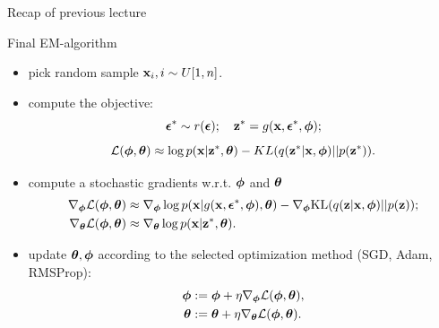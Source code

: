\begin{frame}{Recap of previous lecture}
	\begin{block}{Final EM-algorithm}
		\begin{itemize}
			\item pick random sample $\mathbf{x}_i, i \sim U[1, n]$.
			\item compute the objective:
			\vspace{-0.3cm}
			\[
			\boldsymbol{\epsilon}^* \sim r(\boldsymbol{\epsilon}); \quad \mathbf{z}^* = g(\mathbf{x}, \boldsymbol{\epsilon}^*, \boldsymbol{\phi});
			\]
			\[
			\mathcal{L}(\boldsymbol{\phi}, \boldsymbol{\theta}) \approx  \log p(\mathbf{x} | \mathbf{z}^*, \boldsymbol{\theta}) - KL(q(\mathbf{z}^* | \mathbf{x}, \boldsymbol{\phi}) || p(\mathbf{z}^*)).
			\]
			\item compute a stochastic gradients w.r.t. $\boldsymbol{\phi}$ and $\boldsymbol{\theta}$
			\begin{align*}
				\nabla_{\boldsymbol{\phi}} \mathcal{L} (\boldsymbol{\phi}, \boldsymbol{\theta}) &\approx \nabla_{\boldsymbol{\phi}} \log p(\mathbf{x} | g(\mathbf{x}, \boldsymbol{\epsilon}^*, \boldsymbol{\phi}), \boldsymbol{\theta})  - \nabla_{\boldsymbol{\phi}} \text{KL}(q(\mathbf{z} | \mathbf{x}, \boldsymbol{\phi}) || p(\mathbf{z})); \\
				\nabla_{\boldsymbol{\theta}} \mathcal{L} (\boldsymbol{\phi}, \boldsymbol{\theta}) &\approx \nabla_{\boldsymbol{\theta}} \log p(\mathbf{x}|\mathbf{z}^*, \boldsymbol{\theta}).
			\end{align*}
			\item update $\boldsymbol{\theta}, \boldsymbol{\phi}$ according to the selected optimization method (SGD, Adam, RMSProp):
			\begin{align*}
				\boldsymbol{\phi} &:= \boldsymbol{\phi} + \eta \nabla_{\boldsymbol{\phi}} \mathcal{L}(\boldsymbol{\phi}, \boldsymbol{\theta}), \\
				\boldsymbol{\theta} &:= \boldsymbol{\theta} + \eta \nabla_{\boldsymbol{\theta}} \mathcal{L}(\boldsymbol{\phi}, \boldsymbol{\theta}).
			\end{align*}
		\end{itemize}
	\end{block}
\end{frame}
